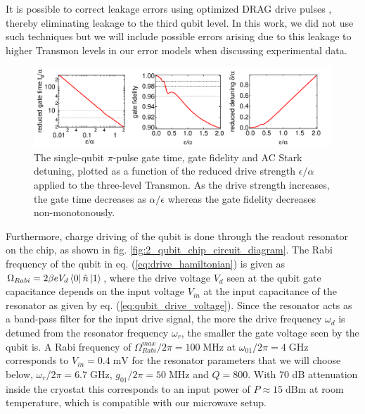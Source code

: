 \smallskip

It is possible to correct leakage errors using optimized DRAG drive pulses \cite{lucero_reduced_2010,chow_optimized_2010}, thereby eliminating leakage to the third qubit level. In this work, we did not use such techniques but we will  include possible errors arising due to this leakage to higher Transmon levels in our error models when discussing experimental data.

\begin{figure}[htp!]
	\centering
	\includegraphics[width=\textwidth]{"./material/mathematica/three_level_driving_errors"}
	\caption[Single-qubit $\pi$-pulse gate time, gate fidelity and AC stark detuning as a function of drive strength]{The single-qubit $\pi$-pulse gate time, gate fidelity and AC Stark detuning, plotted as a function of the reduced drive strength $\epsilon/\alpha$ applied to the three-level Transmon. As the drive strength increases, the gate time decreases as $\alpha/\epsilon$ whereas the gate fidelity decreases non-monotonously.}
	\label{fig:three_level_driving_errors}
\end{figure}

\smallskip 

Furthermore, charge driving of the qubit is done through the readout resonator on the chip, as shown in fig. \ref{fig:2_qubit_chip_circuit_diagram}. The Rabi frequency of the qubit in eq. (\ref{eq:drive_hamiltonian}) is given as $\Omega_{Rabi}= 2 \beta e V_d \left< 0 \right|\hat{n}\left| 1 \right>$, where the drive voltage $V_d$ seen at the qubit gate capacitance depends on the input voltage $V_{in}$ at the input capacitance of the resonator as given by eq. (\ref{eq:qubit_drive_voltage}). Since the resonator acts as a band-pass filter for the input drive signal, the more the drive frequency $\omega_d$ is detuned from the resonator frequency $\omega_r$, the smaller the gate voltage seen by the qubit is. A Rabi frequency of $\Omega_{Rabi}^{max}/2\pi=100\;\mathrm{MHz}$ at $\omega_{01}/2\pi=4\;\mathrm{GHz}$ corresponds to $V_{in}=0.4\;\mathrm{mV}$ for the resonator parameters that we will choose below, $\omega_r/2\pi = 6.7\;\mathrm{GHz}$, $g_{01}/2\pi=50\;\mathrm{MHz}$ and $Q=800$. With 70 dB attenuation inside the cryostat this corresponds to an input power of $P\approx 15\;\mathrm{dBm}$ at room temperature, which is compatible with our microwave setup.

